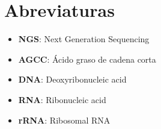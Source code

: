 \chapter{Abreviaturas}
\label{chap:abr}


\begin{itemize}[itemsep=0pt, parsep=0pt]
  \item \textbf{NGS}: Next Generation Sequencing
  \item \textbf{AGCC}: Ácido graso de cadena corta
  \item \textbf{DNA}: Deoxyribonucleic acid
  \item \textbf{RNA}: Ribonucleic acid
  \item \textbf{rRNA}: Ribosomal RNA
\end{itemize}